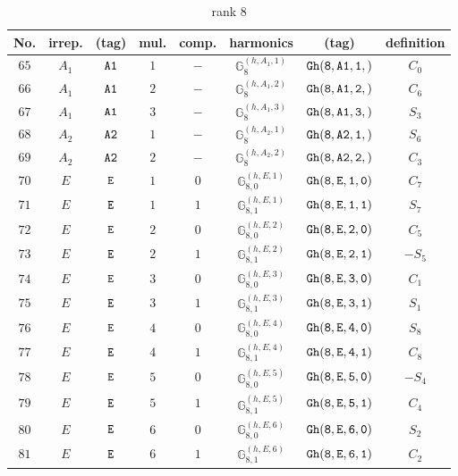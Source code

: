 \documentclass[fleqn,8pt]{jsarticle}
\begin{document}
\begin{table}[ht!]
\begin{center}
\caption{rank 8}
\renewcommand{\arraystretch}{1.3}
\begin{tabular}{cccccccc} \hline \hline
No. & irrep. & (tag) & mul. & comp. & harmonics & (tag) & definition \\ \hline
$ 65 $ & $ A_{1} $ & $ {\tt A1} $ & $ 1 $ & $ - $ & $ \mathbb{G}_{8}^{(h,A_{1},1)} $ & $ {\tt Gh(8,A1,1,)} $ & $ C_{0} $ \\
$ 66 $ & $ A_{1} $ & $ {\tt A1} $ & $ 2 $ & $ - $ & $ \mathbb{G}_{8}^{(h,A_{1},2)} $ & $ {\tt Gh(8,A1,2,)} $ & $ C_{6} $ \\
$ 67 $ & $ A_{1} $ & $ {\tt A1} $ & $ 3 $ & $ - $ & $ \mathbb{G}_{8}^{(h,A_{1},3)} $ & $ {\tt Gh(8,A1,3,)} $ & $ S_{3} $ \\
$ 68 $ & $ A_{2} $ & $ {\tt A2} $ & $ 1 $ & $ - $ & $ \mathbb{G}_{8}^{(h,A_{2},1)} $ & $ {\tt Gh(8,A2,1,)} $ & $ S_{6} $ \\
$ 69 $ & $ A_{2} $ & $ {\tt A2} $ & $ 2 $ & $ - $ & $ \mathbb{G}_{8}^{(h,A_{2},2)} $ & $ {\tt Gh(8,A2,2,)} $ & $ C_{3} $ \\
$ 70 $ & $ E $ & $ {\tt E} $ & $ 1 $ & $ 0 $ & $ \mathbb{G}_{8,0}^{(h,E,1)} $ & $ {\tt Gh(8,E,1,0)} $ & $ C_{7} $ \\
$ 71 $ & $ E $ & $ {\tt E} $ & $ 1 $ & $ 1 $ & $ \mathbb{G}_{8,1}^{(h,E,1)} $ & $ {\tt Gh(8,E,1,1)} $ & $ S_{7} $ \\
$ 72 $ & $ E $ & $ {\tt E} $ & $ 2 $ & $ 0 $ & $ \mathbb{G}_{8,0}^{(h,E,2)} $ & $ {\tt Gh(8,E,2,0)} $ & $ C_{5} $ \\
$ 73 $ & $ E $ & $ {\tt E} $ & $ 2 $ & $ 1 $ & $ \mathbb{G}_{8,1}^{(h,E,2)} $ & $ {\tt Gh(8,E,2,1)} $ & $ - S_{5} $ \\
$ 74 $ & $ E $ & $ {\tt E} $ & $ 3 $ & $ 0 $ & $ \mathbb{G}_{8,0}^{(h,E,3)} $ & $ {\tt Gh(8,E,3,0)} $ & $ C_{1} $ \\
$ 75 $ & $ E $ & $ {\tt E} $ & $ 3 $ & $ 1 $ & $ \mathbb{G}_{8,1}^{(h,E,3)} $ & $ {\tt Gh(8,E,3,1)} $ & $ S_{1} $ \\
$ 76 $ & $ E $ & $ {\tt E} $ & $ 4 $ & $ 0 $ & $ \mathbb{G}_{8,0}^{(h,E,4)} $ & $ {\tt Gh(8,E,4,0)} $ & $ S_{8} $ \\
$ 77 $ & $ E $ & $ {\tt E} $ & $ 4 $ & $ 1 $ & $ \mathbb{G}_{8,1}^{(h,E,4)} $ & $ {\tt Gh(8,E,4,1)} $ & $ C_{8} $ \\
$ 78 $ & $ E $ & $ {\tt E} $ & $ 5 $ & $ 0 $ & $ \mathbb{G}_{8,0}^{(h,E,5)} $ & $ {\tt Gh(8,E,5,0)} $ & $ - S_{4} $ \\
$ 79 $ & $ E $ & $ {\tt E} $ & $ 5 $ & $ 1 $ & $ \mathbb{G}_{8,1}^{(h,E,5)} $ & $ {\tt Gh(8,E,5,1)} $ & $ C_{4} $ \\
$ 80 $ & $ E $ & $ {\tt E} $ & $ 6 $ & $ 0 $ & $ \mathbb{G}_{8,0}^{(h,E,6)} $ & $ {\tt Gh(8,E,6,0)} $ & $ S_{2} $ \\
$ 81 $ & $ E $ & $ {\tt E} $ & $ 6 $ & $ 1 $ & $ \mathbb{G}_{8,1}^{(h,E,6)} $ & $ {\tt Gh(8,E,6,1)} $ & $ C_{2} $ \\
 \hline \hline
\end{tabular}
\end{center}
\end{table}
\end{document}
